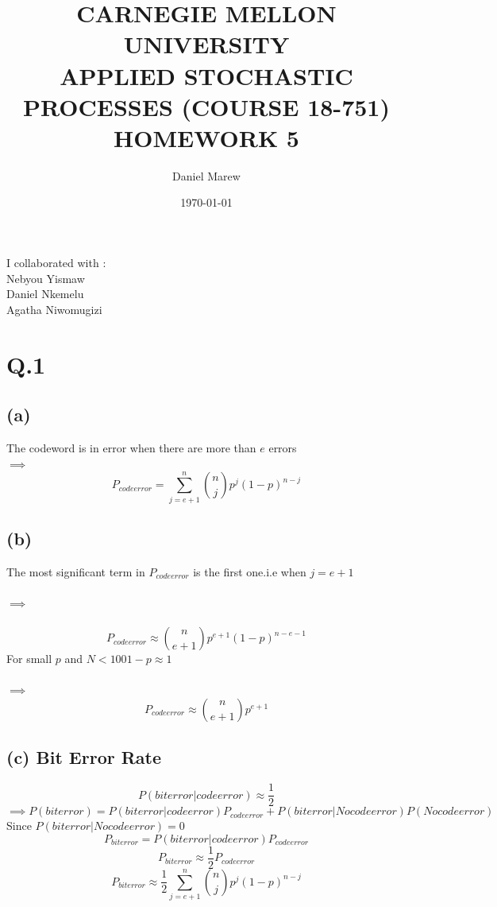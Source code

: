 \documentclass[a4paper,11pt]{article}
\begin{document}
\title{\color{red}CARNEGIE MELLON UNIVERSITY\\
APPLIED STOCHASTIC PROCESSES  (COURSE 18-751)\\
HOMEWORK 5}
\author{Daniel Marew}
\date{\today}
\clearpage\maketitle

\thispagestyle{empty}
\newpage
I collaborated with :\\
\hspace*{6cm}
Nebyou Yismaw\\
\hspace*{6cm}
Daniel    Nkemelu\\
\hspace*{6cm}
Agatha Niwomugizi
\thispagestyle{empty}
\newpage
\clearpage
\setcounter{page}{1}
\section*{Q.1}
\subsection*{(a)}
The codeword is in error when there are more than $e$ errors\\
$\implies$
$$P_{codeerror} =\sum_{j=e+1}^{n} \binom{n}{j}p^j(1-p)^{n-j}$$
\subsection*{(b)}
The most significant term in $P_{codeerror}$ is the first one.i.e when $j = e+1$\\\\
$\implies$\\\\
$$P_{codeerror} \approx \binom{n}{e+1}p^{e+1}(1-p)^{n-e-1}$$
For small $p$ and $N<100$\quad $1-p \approx 1$ \\\\
$\implies$\\
$$P_{codeerror} \approx \binom{n}{e+1}p^{e+1}$$
\subsection*{(c) Bit Error Rate}
$$P(biterror|codeerror) \approx \frac{1}{2}$$
$$\implies  P(biterror) = P(biterror|codeerror)P_{codeerror}+P(biterror|Nocodeerror)P(Nocodeerror)$$
Since $P(biterror|Nocodeerror) = 0$
$$ P_{biterror} = P(biterror|codeerror)P_{codeerror}$$
$$ P_{biterror} \approx \frac{1}{2}P_{codeerror}$$
$$ P_{biterror} \approx \frac{1}{2}\sum_{j=e+1}^{n} \binom{n}{j}p^j(1-p)^{n-j}$$
\newpage
\clearpage
\end{document}
